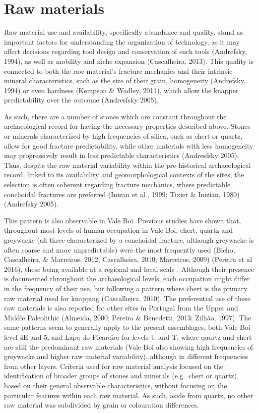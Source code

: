 \documentclass[12pt,twoside]{reedthesis}
\begin{document}
\hypertarget{raw-materials}{%
\section{Raw materials}\label{raw-materials}}

Raw material use and availability, specifically abundance and quality, stand as important factors for understanding the organization of technology, as it may affect decisions regarding tool design and conservation of such tools (Andrefsky, 1994), as well as mobility and niche expansion (Cascalheira, 2013). This quality is connected to both the raw material's fracture mechanics and their intrinsic mineral characteristics, such as the size of their grain, homogeneity (Andrefsky, 1994) or even hardness (Kempson \& Wadley, 2011), which allow the knapper predictability over the outcome (Andresfsky 2005).

As such, there are a number of stones which are constant throughout the archaeological record for having the necessary properties described above. Stones or minerals characterized by high frequencies of silica, such as chert or quartz, allow for good fracture predictability, while other materials with less homogeneity may progressively result in less predictable characteristics (Andresfsky 2005). Thus, despite the raw material variability within the pre-historical archaeological record, linked to its availability and geomorphological contexts of the sites, the selection is often coherent regarding fracture mechanics, where predictable conchoidal fractures are preferred (Inizan et al., 1999; Tixier \& Inizian, 1980) (Andrefsky 2005).

This pattern is also observable in Vale Boi. Previous studies have shown that, throughout most levels of human occupation in Vale Boi, chert, quartz and greywacke (all three characterized by a conchoidal fracture, although greywacke is often coarse and more unpredictable) were the most frequently used (Bicho, Cascalheira, \& Marreiros, 2012; Cascalheira, 2010; Marreiros, 2009) (Pereira et al 2016), these being available at a regional and local scale . Although their presence is documented throughout the archaeological levels, each occupation might differ in the frequency of their use, but following a pattern where chert is the primary raw material used for knapping (Cascalheira, 2010). The preferential use of these raw materials is also reported for other sites in Portugal from the Upper and Middle Paleolithic (Almeida, 2000; Pereira \& Benedetti, 2013; Zilhão, 1997).
The same patterns seem to generally apply to the present assemblages, both Vale Boi level 4E and 5, and Lapa do Picareiro for levels U and T, where quartz and chert are still the predominant raw materials (Vale Boi also showing high frequencies of greywacke and higher raw material variability), although in different frequencies from other layers.
Criteria used for raw material analysis focused on the identification of broader groups of stones and minerals (e.g.~chert or quartz), based on their general observable characteristics, without focusing on the particular features within each raw material. As such, aside from quartz, no other raw material was subdivided by grain or colouration differences.
\end{document}
